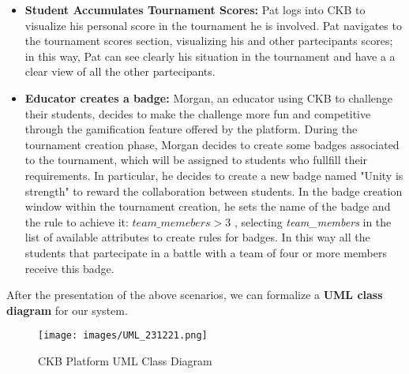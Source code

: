 \documentclass[a4paper, 11pt, titlepage]{article}
\begin{document}
\begin{itemize}
    \item \textbf{Student Accumulates Tournament Scores:} Pat logs into CKB to visualize his personal score in
     the tournament he is involved. Pat navigates to the tournament scores section, visualizing his and other 
     partecipants scores; in this way, Pat can see clearly his situation in the tournament and have a a clear view  
     of all the other partecipants.

    \item \textbf{Educator creates a badge:} Morgan, an educator using CKB to challenge their students, decides to 
    make the challenge more fun and competitive through the gamification feature offered by the platform. During the tournament
    creation phase, Morgan decides to create some badges associated to the tournament, which will be assigned to students who fullfill their requirements. 
    In particular, he decides to create a new badge named "Unity is strength" to reward the collaboration between students.
    In the badge creation window within the tournament creation, he sets the name of the badge and the rule to achieve it:
    $ {team\_memebers} > 3 $
, selecting \textit{team\_members} in the list of available attributes to create rules for badges. 
    In this way all the students that partecipate in a battle with a team of four or more members receive this badge.
\end{itemize}
After the presentation of the above scenarios, we can formalize a \textbf{UML class diagram} for our system. 

\begin{figure}[h]
    \texttt{[image: images/UML\_231221.png]}
    \caption{CKB Platform UML Class Diagram}
    \label{fig:CKB_uml1}
    \centering
\end{figure}
\end{document}
